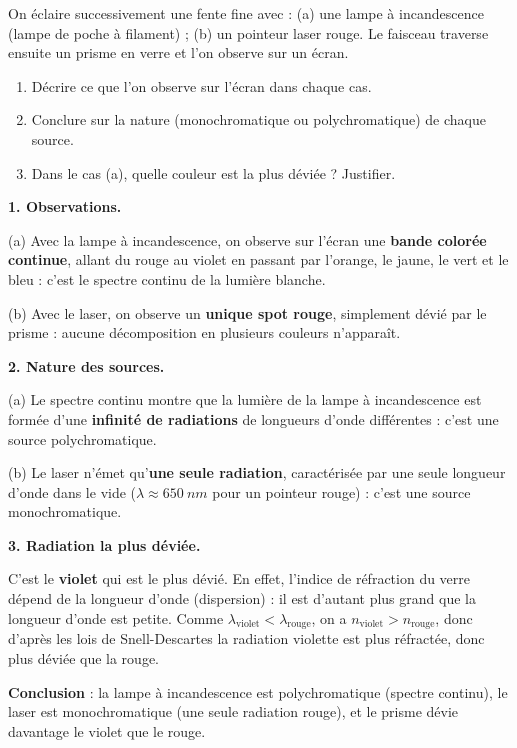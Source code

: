 \documentclass[11pt]{article}
\newcommand{\cle}[1]{{\popxbold\color{popdark}#1}}
\begin{document}
\begin{exoresolu}
On éclaire successivement une fente fine avec : (a) une lampe à incandescence (lampe de poche à filament) ; (b) un pointeur laser rouge. Le faisceau traverse ensuite un prisme en verre et l'on observe sur un écran.
\begin{enumerate}
\item Décrire ce que l'on observe sur l'écran dans chaque cas.
\item Conclure sur la nature (monochromatique ou polychromatique) de chaque source.
\item Dans le cas (a), quelle couleur est la plus déviée ? Justifier.
\end{enumerate}
\tcblower
\textbf{1. Observations.}

(a) Avec la lampe à incandescence, on observe sur l'écran une \textbf{bande colorée continue}, allant du rouge au violet en passant par l'orange, le jaune, le vert et le bleu : c'est le \cle{spectre continu} de la lumière blanche.

(b) Avec le laser, on observe un \textbf{unique spot rouge}, simplement dévié par le prisme : aucune décomposition en plusieurs couleurs n'apparaît.

\textbf{2. Nature des sources.}

(a) Le spectre continu montre que la lumière de la lampe à incandescence est formée d'une \textbf{infinité de radiations} de longueurs d'onde différentes : c'est une source \cle{polychromatique}.

(b) Le laser n'émet qu'\textbf{une seule radiation}, caractérisée par une seule longueur d'onde dans le vide ($\lambda \approx \SI{650}{nm}$ pour un pointeur rouge) : c'est une source \cle{monochromatique}.

\textbf{3. Radiation la plus déviée.}

C'est le \textbf{violet} qui est le plus dévié. En effet, l'indice de réfraction du verre dépend de la longueur d'onde (dispersion) : il est d'autant plus grand que la longueur d'onde est petite. Comme $\lambda_{\text{violet}} < \lambda_{\text{rouge}}$, on a $n_{\text{violet}} > n_{\text{rouge}}$, donc d'après les lois de Snell-Descartes la radiation violette est plus réfractée, donc plus déviée que la rouge.

\textbf{Conclusion} : la lampe à incandescence est polychromatique (spectre continu), le laser est monochromatique (une seule radiation rouge), et le prisme dévie davantage le violet que le rouge.
\end{exoresolu}
\end{document}
